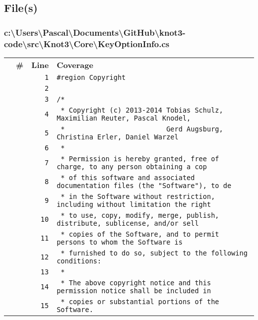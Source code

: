 \documentclass[a4paper,10pt]{article}
\begin{document}
\subsection{File(s)}
\subsubsection{c:\textbackslash Users\textbackslash Pascal\textbackslash Documents\textbackslash GitHub\textbackslash knot3-code\textbackslash src\textbackslash Knot3\textbackslash Core\textbackslash KeyOptionInfo.cs}
\begin{longtable}[l]{lrrl}
\textbf{} & \textbf{\#} & \textbf{Line} & \textbf{Coverage}\\
\cellcolor{gray} &  & \verb~1~ & \verb~#region Copyright~\\
\cellcolor{gray} &  & \verb~2~ & \verb~~\\
\cellcolor{gray} &  & \verb~3~ & \verb~/*~\\
\cellcolor{gray} &  & \verb~4~ & \verb~ * Copyright (c) 2013-2014 Tobias Schulz, Maximilian Reuter, Pascal Knodel,~\\
\cellcolor{gray} &  & \verb~5~ & \verb~ *                         Gerd Augsburg, Christina Erler, Daniel Warzel~\\
\cellcolor{gray} &  & \verb~6~ & \verb~ *~\\
\cellcolor{gray} &  & \verb~7~ & \verb~ * Permission is hereby granted, free of charge, to any person obtaining a cop~\\
\cellcolor{gray} &  & \verb~8~ & \verb~ * of this software and associated documentation files (the "Software"), to de~\\
\cellcolor{gray} &  & \verb~9~ & \verb~ * in the Software without restriction, including without limitation the right~\\
\cellcolor{gray} &  & \verb~10~ & \verb~ * to use, copy, modify, merge, publish, distribute, sublicense, and/or sell~\\
\cellcolor{gray} &  & \verb~11~ & \verb~ * copies of the Software, and to permit persons to whom the Software is~\\
\cellcolor{gray} &  & \verb~12~ & \verb~ * furnished to do so, subject to the following conditions:~\\
\cellcolor{gray} &  & \verb~13~ & \verb~ *~\\
\cellcolor{gray} &  & \verb~14~ & \verb~ * The above copyright notice and this permission notice shall be included in ~\\
\cellcolor{gray} &  & \verb~15~ & \verb~ * copies or substantial portions of the Software.~\\

\end{longtable}
\end{document}

